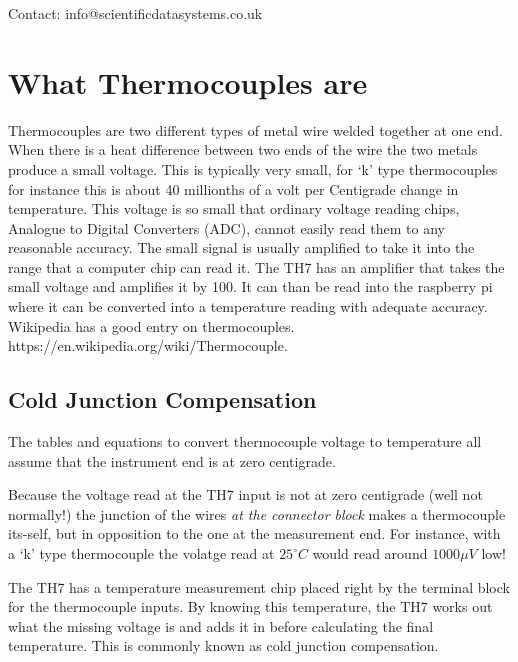 \documentclass[10pt,foldmark]{leaflet}
\begin{document}

\vspace{0.5cm}
Contact: info@scientificdatasystems.co.uk

\clearpage

\section{What Thermocouples are}

Thermocouples are two different types of metal wire welded together
at one end.
When there is a heat difference between two ends of the wire
the two metals produce a small voltage.
This is typically very small, for `k' type thermocouples for instance
this is about 40 millionths of a volt per Centigrade change in temperature.
%
This voltage is so small that ordinary voltage reading chips, Analogue to Digital Converters (ADC),  cannot easily read them
to any reasonable accuracy.
%
The small signal is usually amplified
to take it into the range that a computer chip can read it.
The TH7 has an amplifier that takes the small voltage and amplifies it by 100.
It can than be read into the raspberry pi where it can be converted into
a temperature reading with adequate accuracy.
Wikipedia has a good entry on thermocouples.
https://en.wikipedia.org/wiki/Thermocouple.

\subsection{Cold Junction Compensation}

The tables and equations to convert thermocouple voltage to
temperature all assume that the instrument end is at zero centigrade.

Because the voltage read at the TH7 input is not at zero centigrade (well not normally!)
the junction of the wires {\em at the connector block}  makes a thermocouple its-self, but in opposition to
the one at the measurement end. For instance, with a `k' type thermocouple
the volatge read at $25^\circ C$ would read around $1000 \mu V$ low!

The TH7 has a temperature measurement chip placed right by the terminal block for the thermocouple inputs.
By knowing this temperature, the TH7 works out what the missing voltage is
and adds it in before calculating the final temperature. This is commonly known as cold junction compensation.
\end{document}
